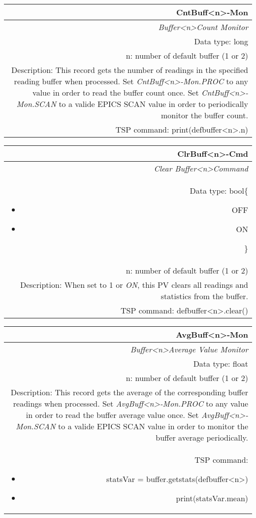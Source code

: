 \documentclass[openany]{article}
\begin{document}
		\begin{tabular}{N}
			\hline
			\bfseries CntBuff\textless n\textgreater-Mon\label{pv:cntbuff-mon} \\ \hline
			\emph{Buffer\textless n\textgreater Count Monitor} \\
			Data type: long \\
			n: number of default buffer (1 or 2) \\
			Description: This record gets the number of readings in the specified reading buffer when processed. Set \emph{CntBuff\textless n\textgreater-Mon.PROC} to any value in order to read the buffer count once. Set \emph{CntBuff\textless n\textgreater-Mon.SCAN} to a valide EPICS SCAN value in order to periodically monitor the buffer count. \\
			TSP command: print(defbuffer\textless n\textgreater.n)
		\end{tabular}

		\begin{tabular}{N}
			\hline
			\bfseries ClrBuff\textless n\textgreater-Cmd\label{pv:clrbuff-cmd} \\ \hline
			\emph{Clear Buffer\textless n\textgreater Command} \\
			Data type: bool\{\begin{itemize}[noitemsep]
				\small
				\item[] OFF
				\item[] ON
			\end{itemize}\} \\
			n: number of default buffer (1 or 2) \\
			Description: When set to 1 or \emph{ON}, this PV clears all readings and statistics from the buffer. \\
			TSP command: defbuffer\textless n\textgreater.clear()
		\end{tabular}

		\begin{tabular}{N}
			\hline
			\bfseries AvgBuff\textless n\textgreater-Mon\label{pv:avgbuff-mon} \\ \hline
			\emph{Buffer\textless n\textgreater Average Value Monitor} \\
			Data type: float \\
			n: number of default buffer (1 or 2) \\
			Description: This record gets the average of the corresponding buffer readings when processed. Set \emph{AvgBuff\textless n\textgreater-Mon.PROC} to any value in order to read the buffer average value once. Set \emph{AvgBuff\textless n\textgreater-Mon.SCAN} to a valide EPICS SCAN value in order to monitor the buffer average periodically. \\
			TSP command: \begin{itemize} \item[] statsVar = buffer.getstats(defbuffer\textless n\textgreater) \item[] print(statsVar.mean) \end{itemize}
		\end{tabular}
\end{document}
